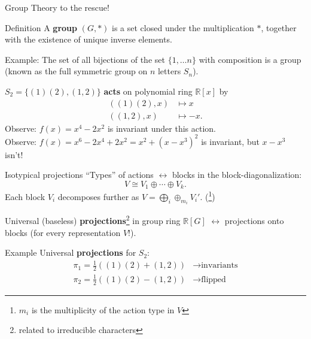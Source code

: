 \begin{frame}{Group Theory to the rescue!}
  \begin{block}{Definition}
    A \textbf{group} $(G, *)$ is a set closed under the multiplication $*$, together with the existence of unique inverse elements.
  \end{block}
    {\small Example: The set of all bijections of the set $\{1,\ldots n\}$ with composition is a group (known as the full symmetric group on $n$ letters $S_n$).}
    
    $S_2 = \{(1)(2), (1,2)\}$ \textbf{acts} on polynomial ring $\mathbb{R}[x]$ by
    \begin{align*}
      ((1)(2), x) & \mapsto x\\
      ((1, 2), x) & \mapsto -x.
    \end{align*}
    {\small Observe: $f(x) = x^4 - 2x^2$ is invariant under this action.\\
    Observe: $f(x) = x^6 - 2x^4 + 2x^2 = x^2 + (x-x^3)^2$ is invariant, but $x-x^3$ isn't!}
    
\end{frame}


\begin{frame}{Isotypical projections}
    ``Types'' of actions $\leftrightarrow$  blocks in the block-diagonalization:
    \[V \cong V_1 \oplus \cdots \oplus V_k.\]    
    Each block $V_i$ decomposes further as 
    $V = \bigoplus_i \oplus_{m_i} V_i'$. (\footnote{$m_i$ is the multiplicity of the action type in $V$})
    
    Universal (baseless) \textbf{projections}\footnote{related to irreducible characters} in group ring $\mathbb{R}[G]$ $\leftrightarrow$ projections onto blocks (for every representation $V$!).
%     
    \begin{block}{Example}
    \small
    Universal \textbf{projections} for $S_2$:\\[-0.2in]
    \begin{align*}
      \pi_1 = \frac{1}{2}((1)(2) + (1,2)) & \to\text{invariants}\\ 
      \pi_2 = \frac{1}{2}((1)(2) - (1,2)) & \to\text{flipped}
    \end{align*}
    \end{block}
    
\end{frame}


